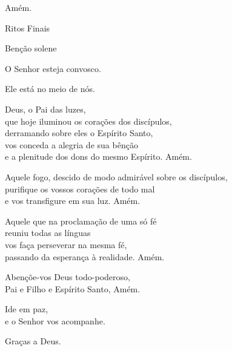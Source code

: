 \documentclass{book}
\begin{document}
\begin{flushleft}
    Amém.

    Ritos Finais

    Benção solene

    O Senhor esteja convosco.

    Ele está no meio de nós.

    Deus, o Pai das luzes, \\
    que hoje iluminou os corações dos discípulos, \\
    derramando sobre eles o Espírito Santo, \\
    vos conceda a alegria de sua bênção \\
    e a plenitude dos dons do mesmo Espírito.
    Amém.

    Aquele fogo, descido de modo admirável sobre os discípulos, \\
    purifique os vossos corações de todo mal \\
    e vos transfigure em sua luz.
    Amém.

    Aquele que na proclamação de uma só fé \\
    reuniu todas as línguas \\
    vos faça perseverar na mesma fé, \\
    passando da esperança à realidade.
    Amém.

    Abençõe-vos Deus todo-poderoso, \\
    Pai e Filho e Espírito Santo,
    Amém.

    Ide em paz, \\
    e o Senhor vos acompanhe.

    Graças a Deus.

\end{flushleft}
\end{document}
